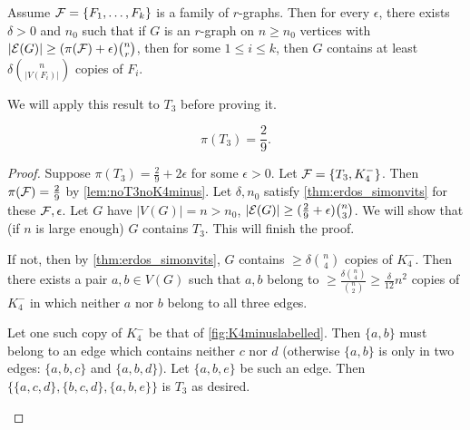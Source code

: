 \begin{theorem} \label{thm:erdos_simonvits} 
Assume $\mathcal{F} = \{F_1,\dotsc,F_k\}$ is a family of $r$-graphs. Then for every $\epsilon$, there exists $\delta >0$ and $n_0$ such that if $G$ is an $r$-graph on $n\geq n_0$ vertices with $|\mathcal{E} (G)| \geq (\pi(\mathcal{F}) + \epsilon) {n \choose r}$, then for some $1\leq i \leq k$, then $G$ contains at least $\delta {n\choose |V(F_i)|}$ copies of $F_i$.
\end{theorem}
We will  apply this result to $T_3$ before proving it.
\begin{theorem}
\[
\pi(T_3) = \frac{2}{9}.
\]
\end{theorem}
\begin{proof}	
Suppose $\pi(T_3) = \frac{2}{9}+ 2 \epsilon$ for some $\epsilon>0$. Let $\mathcal{F} = \{T_3, K_4^-\}$. Then $\pi(\mathcal{F}) = \frac{2}{9}$ by \cref{lem:noT3noK4minus}. Let $\delta,n_0$ satisfy \cref{thm:erdos_simonvits} for these $\mathcal{F},\epsilon$. Let $G$ have $|V(G)| = n > n_0$, $|\mathcal{E} (G)| \geq ( \frac{2}{9}+ \epsilon) {n \choose 3}$. We will show that (if $n$ is large enough) $G$ contains $T_3$. This will finish the proof. 

If not, then by \cref{thm:erdos_simonvits}, $G$ contains $\geq \delta {n\choose 4}$ copies of $K_4^-$. Then there exists a pair $a,b\in V(G)$ such that $a,b$ belong to $\geq \frac{\delta {n\choose 4}}{{n \choose 2}} \geq \frac{\delta}{12}n^2$ copies of $K_4^-$ in which neither $a$ nor $b$ belong to all three edges.

Let one such copy of $K_4^-$ be that of \cref{fig:K4minuslabelled}. Then $\{a,b\}$ must belong to an edge which contains  neither $c$ nor $d$ (otherwise $\{a,b\}$ is only in two edges: $\{a,b,c\}$ and $\{a,b,d\}$).
Let $\{a,b,e\}$ be such an edge. Then $\{\{a,c,d\},\{b,c,d\},\{a,b,e\}\}$ is $T_3$ as desired. \qedhere

\begin{marginfigure}
\begin{center}
\end{center}
\end{marginfigure}
\end{proof}
